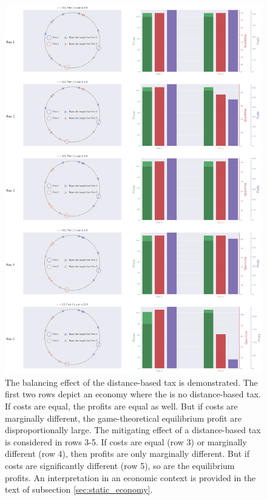 \documentclass[final,3p,times,authoryear,12pt]{elsarticle}
\begin{document}
\begin{figure}[[p!htb] %
  \centering
  \vspace{-2cm} %
  \includegraphics[width=\linewidth]{static_game.png}
  \caption{\small{
  		The balancing effect of the distance-based tax is demonstrated. 
		The first two rows depict an economy where the is no distance-based tax. 
		If costs are equal, the profits are equal as well. 
		But if costs are marginally different, the game-theoretical equilibrium profit are disproportionally large. 
		The mitigating effect of a distance-based tax is considered in rows 3-5. 
		If costs are equal (row 3) or marginally different (row 4), then profits are only marginally different. 
		But if costs are significantly different (row 5), so are the equilibrium profits. 
		An interpretation in an economic context is provided in the text of subsection \ref{sec:static_economy}. 
		 }}
  \label{fig:static_game}
\end{figure}
\end{document}
